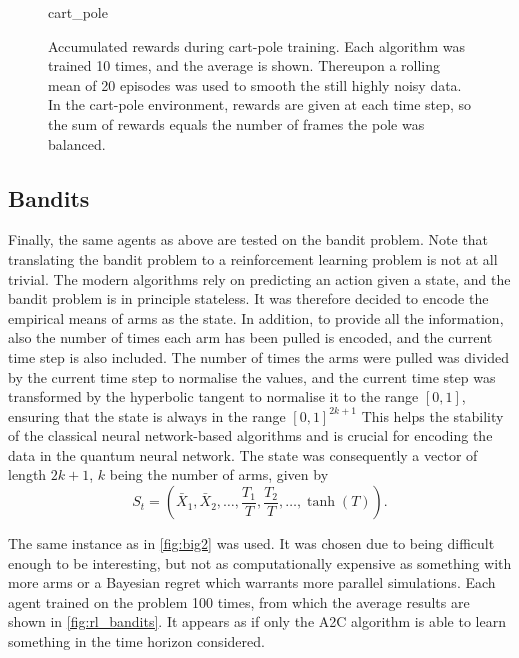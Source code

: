 \begin{figure}
    \centering
    \newcommand{\myoptions}{
        width=10cm,
        height=8cm,
        xlabel={Episode},
        ylabel={Sum of rewards},
        legend cell align=left,
        mystyle,
        legend entries={A2C, DQN, PPO, QNN},
    }
    {cart_pole}
    \caption[
        Accumulated rewards during cart-pole training.
    ]
    {
        Accumulated rewards during cart-pole training.
        Each algorithm was trained 10 times, and the average is shown.
        Thereupon a rolling mean of 20 episodes was used to smooth the still highly noisy data.
        In the cart-pole environment, rewards are given at each time step, so the sum of rewards equals the number of frames the pole was balanced.
    }
    \label{fig:cartpole_training}
\end{figure}

\subsection{Bandits}
Finally, the same agents as above are tested on the bandit problem.
Note that translating the bandit problem to a reinforcement learning problem is not at all trivial.
The modern algorithms rely on predicting an action given a state, and the bandit problem is in principle stateless.
It was therefore decided to encode the empirical means of arms as the state.
In addition, to provide all the information, also the number of times each arm has been pulled is encoded, and the current time step is also included.
The number of times the arms were pulled was divided by the current time step to normalise the values, and the current time step was transformed by the hyperbolic tangent to normalise it to the range $[0, 1]$, ensuring that the state is always in the range $[0, 1]^{2k+1}$
This helps the stability of the classical neural network-based algorithms and is crucial for encoding the data in the quantum neural network.
The state was consequently a vector of length $2k+1$, $k$ being the number of arms, given by
\begin{equation}
    \label{eq:rl_bandit_state}
    S_t = \left(
    \bar{X}_1,
    \bar{X}_2,
    \ldots,
    \frac{T_1}{T},
    \frac{T_2}{T},
    \ldots,
    \tanh(T)
    \right).
\end{equation}

The same instance as in \cref{fig:big2} was used.
It was chosen due to being difficult enough to be interesting, but not as computationally expensive as something with more arms or a Bayesian regret which warrants more parallel simulations.
Each agent trained on the problem 100 times, from which the average results are shown in \cref{fig:rl_bandits}.
It appears as if only the A2C algorithm is able to learn something in the time horizon considered.

